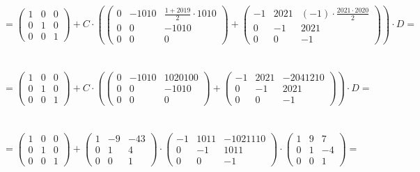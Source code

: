\documentclass[a4paper, 12pt]{article}
\begin{document}
    \\
    \\
    \\ $ = \begin{pmatrix}1 & 0 & 0\\ 0 & 1 & 0\\0 & 0 & 1\end{pmatrix} + C \cdot (\begin{pmatrix}0 & -1010 & \frac{1 + 2019}{2} \cdot 1010\\0 & 0 & -1010\\0 & 0 & 0\end{pmatrix} + \begin{pmatrix}-1 & 2021 & (-1) \cdot \frac{2021 \cdot 2020}{2}\\0 & -1 & 2021\\0 & 0 & -1\end{pmatrix}) \cdot D = $
    \\
    \\
    \\ $ = \begin{pmatrix}1 & 0 & 0\\ 0 & 1 & 0\\0 & 0 & 1\end{pmatrix} + C \cdot (\begin{pmatrix}0 & -1010 & 1020100\\0 & 0 & -1010\\0 & 0 & 0\end{pmatrix} + \begin{pmatrix}-1 & 2021 & -2041210\\0 & -1 & 2021\\0 & 0 & -1\end{pmatrix}) \cdot D = $
    \\
    \\
    \\ $ = \begin{pmatrix}1 & 0 & 0\\ 0 & 1 & 0\\0 & 0 & 1\end{pmatrix} + \begin{pmatrix}1 & -9 & -43 \\0 & 1 & 4 \\0 & 0 & 1 \end{pmatrix} \cdot \begin{pmatrix}-1 & 1011 & -1021110\\0 & -1 & 1011\\0 & 0 & -1\end{pmatrix} \cdot \begin{pmatrix}1 & 9 & 7 \\0 & 1 & -4 \\0 & 0 & 1 \end{pmatrix} = $
\end{document}
